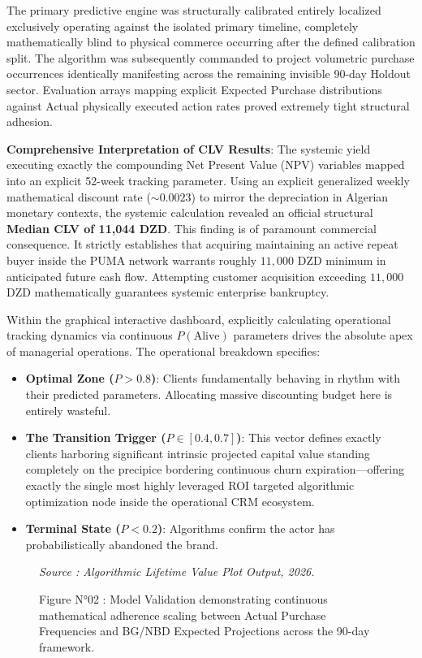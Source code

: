 \documentclass[12pt,a4paper]{report}
\begin{document}
The primary predictive engine was structurally calibrated entirely localized exclusively operating against the isolated primary timeline, completely mathematically blind to physical commerce occurring after the defined calibration split. The algorithm was subsequently commanded to project volumetric purchase occurrences identically manifesting across the remaining invisible 90-day Holdout sector. Evaluation arrays mapping explicit Expected Purchase distributions against Actual physically executed action rates proved extremely tight structural adhesion.

\textbf{Comprehensive Interpretation of CLV Results}: The systemic yield executing exactly the compounding Net Present Value (NPV) variables mapped into an explicit 52-week tracking parameter. Using an explicit generalized weekly mathematical discount rate ($\sim 0.0023$) to mirror the depreciation in Algerian monetary contexts, the systemic calculation revealed an official structural \textbf{Median CLV of 11,044 DZD}. 
This finding is of paramount commercial consequence. It strictly establishes that acquiring maintaining an active repeat buyer inside the PUMA network warrants roughly $11,000$ DZD minimum in anticipated future cash flow. Attempting customer acquisition exceeding $11,000$ DZD mathematically guarantees systemic enterprise bankruptcy. 

Within the graphical interactive dashboard, explicitly calculating operational tracking dynamics via continuous $P(\text{Alive})$ parameters drives the absolute apex of managerial operations. The operational breakdown specifies:
\begin{itemize}
    \item \textbf{Optimal Zone ($P > 0.8$)}: Clients fundamentally behaving in rhythm with their predicted parameters. Allocating massive discounting budget here is entirely wasteful.
    \item \textbf{The Transition Trigger ($P \in [0.4, 0.7]$)}: This vector defines exactly clients harboring significant intrinsic projected capital value standing completely on the precipice bordering continuous churn expiration—offering exactly the single most highly leveraged ROI targeted algorithmic optimization node inside the operational CRM ecosystem.
    \item \textbf{Terminal State ($P < 0.2$)}: Algorithms confirm the actor has probabilistically abandoned the brand.
\end{itemize}

\begin{figure}[H]
    \centering
    \vspace{4cm} 
    \caption{Figure N°02 : Model Validation demonstrating continuous mathematical adherence scaling between Actual Purchase Frequencies and BG/NBD Expected Projections across the 90-day framework.}
    \vspace{0.2cm}
    \footnotesize{\textit{Source : Algorithmic Lifetime Value Plot Output, 2026.}}
    \label{fig:clv_validation}
\end{figure}
\end{document}
